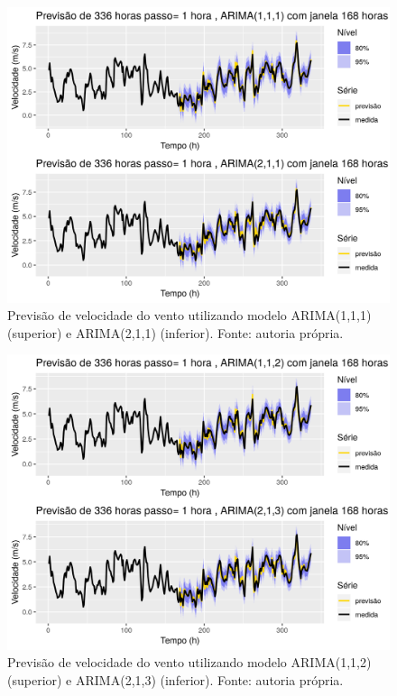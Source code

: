 \documentclass[
	12pt,				%
	openright,			%
	oneside,			%
	a4paper,			%
	english,			%
	french,				%
	spanish,			%
	brazil				%
	]{abntex2}
\begin{document}
\begin{figure}[h]
    \centering
	\includegraphics[width=\textwidth]{arima12}
	\caption{Previsão de velocidade do vento utilizando modelo ARIMA(1,1,1) (superior) e ARIMA(2,1,1) (inferior). Fonte: autoria própria.}
\end{figure}
\FloatBarrier

\begin{figure}[h]
    \centering
	\includegraphics[width=\textwidth]{arima34}
	\caption{Previsão de velocidade do vento utilizando modelo ARIMA(1,1,2) (superior) e ARIMA(2,1,3) (inferior). Fonte: autoria própria.}
\end{figure}
\FloatBarrier
\end{document}
